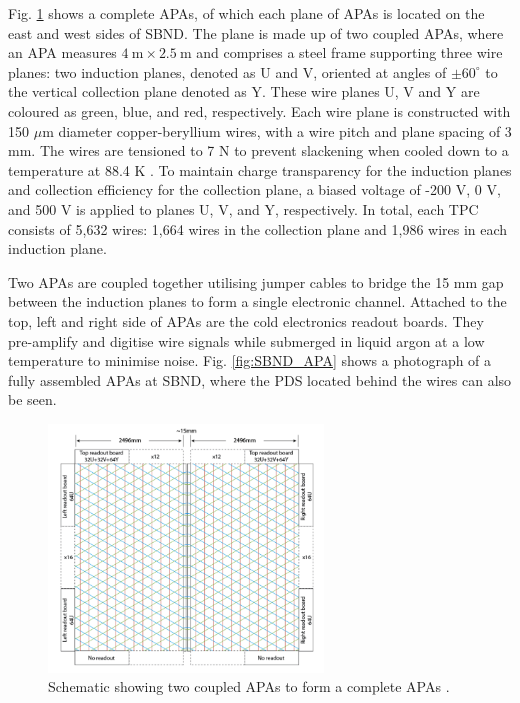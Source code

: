 Fig. \ref{fig:SBND_APA_diag} shows a complete APAs, of which each plane of APAs is located on the east and west sides of SBND.
The plane is made up of two coupled APAs, where an APA measures $4~\mathrm{m} \times 2.5~\mathrm{m}$ and comprises a steel frame supporting three wire planes: two induction planes, denoted as U and V, oriented at angles of $\pm 60^{\circ}$ to the vertical collection plane denoted as Y. 
These wire planes U, V and Y are coloured as green, blue, and red, respectively.
Each wire plane is constructed with 150 $\mu$m diameter copper-beryllium wires, with a wire pitch and plane spacing of 3 mm. 
The wires are tensioned to 7 N to prevent slackening when cooled down to a temperature at 88.4 K \cite{SBND_Wires}.
To maintain charge transparency for the induction planes and collection efficiency for the collection plane, a biased voltage of -200 V, 0 V, and 500 V is applied to planes U, V, and Y, respectively.
In total, each TPC consists of 5,632 wires: 1,664 wires in the collection plane and 1,986 wires in each induction plane.

Two APAs are coupled together utilising jumper cables to bridge the 15 mm gap between the induction planes to form a single electronic channel. 
Attached to the top, left and right side of APAs are the cold electronics readout boards.
They pre-amplify and digitise wire signals while submerged in liquid argon at a low temperature to minimise noise. 
Fig. \ref{fig:SBND_APA} shows a photograph of a fully assembled APAs at SBND, where the PDS located behind the wires can also be seen.  

\begin{figure}[hb!] 
\centering    
\includegraphics[width=0.65\textwidth]{SBND_APA}
\caption[Anode Plane Assemblies Schematic]{
Schematic showing two coupled APAs to form a complete APAs \cite{SBNProposal}.
}
\label{fig:SBND_APA_diag}
\end{figure}

